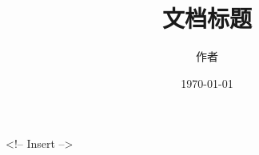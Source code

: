 \documentclass[UTF8, a4paper, 12pt, openany]{ctexbook}
\title{文档标题}
\author{作者}
\date{\today}
\begin{document}
\maketitle
\frontmatter
\tableofcontents

\mainmatter

<!-- Insert -->

\backmatter
\printindex
\end{document}

